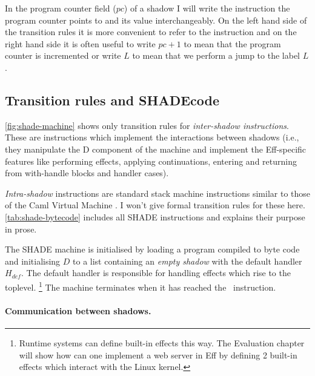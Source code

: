 \documentclass[class=article, crop=false]{standalone}
\begin{document}
In the program counter field ($pc$) of a shadow I will write the instruction the program counter
points to and its value interchangeably. On the left hand side of the transition rules it is more
convenient to refer to the instruction and on the right hand side it is often useful to write
$pc+1$ to mean that the program counter is incremented or write $L$ to mean
that we perform a jump to the label $L$.

\subsection{Transition rules and SHADEcode}

\autoref{fig:shade-machine} shows only transition rules for \emph{inter-shadow instructions}. These are instructions which implement
the interactions between shadows (i.e., they manipulate the D component of the machine and implement the
Eff-specific features like performing effects, applying continuations, entering and returning from with-handle blocks and handler cases).

\emph{Intra-shadow} instructions are standard stack machine instructions similar to those of the Caml Virtual Machine \cite{caml-vm}.
I won't give formal transition rules for these here. \autoref{tab:shade-bytecode} includes all SHADE instructions and explains their purpose in prose.

The SHADE machine is initialised by loading a program compiled to byte code and initialising $D$
to a list containing an \emph{empty shadow} with the default handler $H_{def}$. The default handler
is responsible for handling effects which rise to the toplevel.
\footnote{Runtime systems can define built-in effects this way. The Evaluation chapter will show how
can one implement a web server in Eff by defining 2 built-in effects which interact with the Linux kernel.}
The machine terminates when it has reached the \vmHalt\ instruction.

\paragraph{Communication between shadows.}
\end{document}
